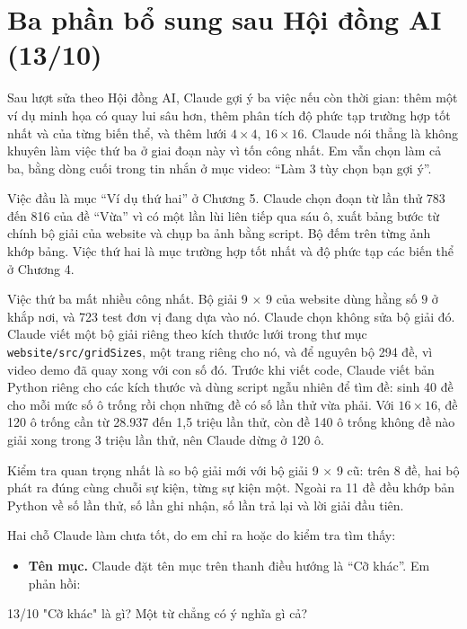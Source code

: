 \section{Ba phần bổ sung sau Hội đồng AI (13/10)}
\label{sec:three-options}

Sau lượt sửa theo Hội đồng AI, Claude gợi ý ba việc nếu còn thời gian: thêm một ví dụ minh họa có quay lui sâu hơn, thêm phân tích độ phức tạp trường hợp tốt nhất và của từng biến thể, và thêm lưới \(4 \times 4\), \(16 \times 16\). Claude nói thẳng là không khuyên làm việc thứ ba ở giai đoạn này vì tốn công nhất. Em vẫn chọn làm cả ba, bằng dòng cuối trong tin nhắn ở mục video: ``Làm 3 tùy chọn bạn gợi ý''.

Việc đầu là mục ``Ví dụ thứ hai'' ở Chương 5. Claude chọn đoạn từ lần thử 783 đến 816 của đề ``Vừa'' vì có một lần lùi liên tiếp qua sáu ô, xuất bảng bước từ chính bộ giải của website và chụp ba ảnh bằng script. Bộ đếm trên từng ảnh khớp bảng. Việc thứ hai là mục trường hợp tốt nhất và độ phức tạp các biến thể ở Chương 4.

Việc thứ ba mất nhiều công nhất. Bộ giải 9 \(\times\) 9 của website dùng hằng số \(9\) ở khắp nơi, và 723 test đơn vị đang dựa vào nó. Claude chọn không sửa bộ giải đó. Claude viết một bộ giải riêng theo kích thước lưới trong thư mục \texttt{website/src/gridSizes}, một trang riêng cho nó, và để nguyên bộ 294 đề, vì video demo đã quay xong với con số đó. Trước khi viết code, Claude viết bản Python riêng cho các kích thước và dùng script ngẫu nhiên để tìm đề: sinh 40 đề cho mỗi mức số ô trống rồi chọn những đề có số lần thử vừa phải. Với \(16 \times 16\), đề 120 ô trống cần từ 28.937 đến 1,5 triệu lần thử, còn đề 140 ô trống không đề nào giải xong trong 3 triệu lần thử, nên Claude dừng ở 120 ô.

Kiểm tra quan trọng nhất là so bộ giải mới với bộ giải 9 \(\times\) 9 cũ: trên 8 đề, hai bộ phát ra đúng cùng chuỗi sự kiện, từng sự kiện một. Ngoài ra 11 đề đều khớp bản Python về số lần thử, số lần ghi nhận, số lần trả lại và lời giải đầu tiên.

Hai chỗ Claude làm chưa tốt, do em chỉ ra hoặc do kiểm tra tìm thấy:

\begin{itemize}
  \item \textbf{Tên mục.} Claude đặt tên mục trên thanh điều hướng là ``Cỡ khác''. Em phản hồi:
\end{itemize}

\begin{promptbox}{13/10}
"Cỡ khác" là gì? Một từ chẳng có ý nghĩa gì cả?
\end{promptbox}

